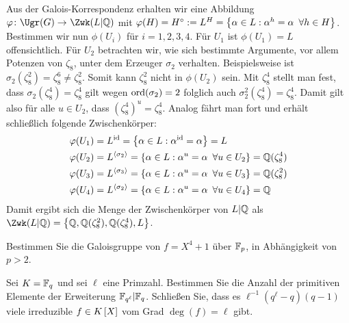 \begin{exercisePage}
	Aus der Galois-Korrespondenz erhalten wir eine Abbildung $\abb{\phi}{\Ugr(G)}{\Zwk(L | \Q)}$ mit $\varphi(H) = H^\circ \mathrel{:=} L^H = \left\{ \alpha \in L : \alpha^h = \alpha \enskip \forall h \in H \right\}$. Bestimmen wir nun $\phi(U_i)$ für $i = 1,2,3,4$. Für $U_1$ ist $\phi(U_1) = L$ offensichtlich. Für $U_2$ betrachten wir, wie sich bestimmte Argumente, vor allem Potenzen von $\zeta_8$, unter dem Erzeuger $\sigma_2$ verhalten. Beispielsweise ist $\sigma_2(\zeta_8^2) = \zeta_8^6 \neq \zeta_8^2$. Somit kann $\zeta_8^2$ nicht in $\phi(U_2)$ sein. Mit $\zeta_8^4$ stellt man fest, dass $\sigma_2(\zeta_8^4) = \zeta_8^4$ gilt wegen $\operatorname{ord}(\sigma_2) = 2$ folglich auch $\sigma_2^2(\zeta_8^4) = \zeta_8^4$. Damit gilt also für alle $u \in U_2$, dass $\left(\zeta_8^4\right)^u  = \zeta_8^4$. Analog fährt man fort und erhält schließlich folgende Zwischenkörper:
	\begin{equation*}
	\begin{aligned}
		\varphi(U_1) &= L^{\operatorname{id}} = \left\{ \alpha \in L : \alpha^{\operatorname{id}} = \alpha \right\} = L \\
		\varphi(U_2) &= L^{\langle \sigma_2 \rangle} =  \left\{ \alpha \in L: \alpha^u = \alpha \enskip \forall u \in U_2 \right\} = \mathbb{Q}(\zeta_8^4) \\
		\varphi(U_3) &= L^{\langle \sigma_3 \rangle} =  \left\{ \alpha \in L: \alpha^u = \alpha \enskip \forall u \in U_3 \right\} = \mathbb{Q}(\zeta_8^2) \\
		\varphi(U_4) &= L^{\langle \sigma_2 \rangle} =  \left\{ \alpha \in L: \alpha^u = \alpha \enskip \forall u \in U_4 \right\} = \mathbb{Q} \\
	\end{aligned}
	\end{equation*}
	Damit ergibt sich die Menge der Zwischenkörper von $L|\mathbb{Q}$ als $\Zwk(L|\Q) = \menge{\Q, \Q(\zeta_8^2), \Q(\zeta_8^4), L}$.
	
	\begin{homework}
		Bestimmen Sie die Galoisgruppe von $f = X^4 + 1$ über $\mathbb{F}_p$, in
		Abhängigkeit von $p > 2$.

	\end{homework}

	\begin{homework}
		Sei $K = \mathbb{F}_q$ und sei $\ell$ eine Primzahl. Bestimmen Sie die Anzahl
		der primitiven Elemente der Erweiterung $\mathbb{F}_{q^\ell} | \mathbb{F}_q$. Schließen Sie, dass es $\ell^{-1} (q^\ell - q) (q - 1)$ viele irreduzible $f \in \polynom[K]$ vom Grad $\deg(f) = \ell$ gibt.
	\end{homework}


\end{exercisePage}
